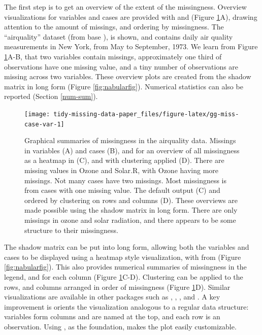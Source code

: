 \documentclass[
]{jss}
\begin{document}
The first step is to get an overview of the extent of the missingness. Overview visualizations for variables and cases are provided with  and  (Figure \ref{fig:gg-miss-case-var}A), drawing attention to the amount of missings, and ordering by missingness. The ``airquality'' dataset (from base ), is shown, and contains daily air quality measurements in New York, from May to September, 1973. We learn from Figure \ref{fig:gg-miss-case-var}A-B, that two variables contain missings, approximately one third of observations have one missing value, and a tiny number of observations are missing across two variables. These overview plots are created from the shadow matrix in long form (Figure \ref{fig:nabularfig}). Numerical statistics can also be reported (Section \ref{num-sum}).

\begin{CodeChunk}
\begin{figure}

{\centering \texttt{[image: tidy-missing-data-paper\_files/figure-latex/gg-miss-case-var-1]} 

}

\caption[Graphical summaries of missingness in the airquality data]{Graphical summaries of missingness in the airquality data. Missings in variables (A) and cases (B), and for an overview of all missingness as a heatmap in (C), and with clustering applied (D). There are missing values in Ozone and Solar.R, with Ozone having more missings. Not many cases have two missings. Most missingness is from cases with one missing value. The default output (C) and ordered by clustering on rows and columns (D). These overviews are made possible using the shadow matrix in long form. There are only missings in ozone and solar radiation, and there appears to be some structure to their missingness.}\label{fig:gg-miss-case-var}
\end{figure}
\end{CodeChunk}

The shadow matrix can be put into long form, allowing both the variables and cases to be displayed using a heatmap style visualization, with  from  \citep{visdat} (Figure \ref{fig:nabularfig}). This also provides numerical summaries of missingness in the legend, and for each column (Figure \ref{fig:gg-miss-case-var}C-D). Clustering can be applied to the rows, and columns arranged in order of missingness (Figure \ref{fig:gg-miss-case-var}D). Similar visualizations are available in other packages such as , , , and . A key improvement is  orients the visualization analogous to a regular data structure: variables form columns and are named at the top, and each row is an observation. Using , as the foundation, makes the plot easily customizable.
\end{document}
